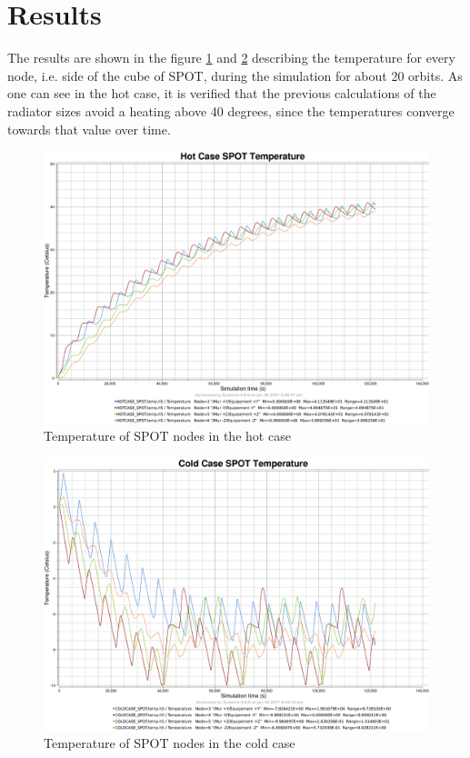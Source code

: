 \section{Results}
The results are shown in the figure \ref{fig:spothot} and \ref{fig:spotcold} describing the temperature for every node, i.e. side of the cube of SPOT, during the simulation for about 20 orbits. As one can see in the hot case, it is verified that the previous calculations of the radiator sizes avoid a heating above 40 degrees, since the temperatures converge towards that value over time. 
\begin{figure}[H]
	\centering
	\includegraphics[scale=0.15]{images/SPOT_hotcase_temperature.png}
	\caption{Temperature of SPOT nodes in the hot case}
	\label{fig:spothot}
\end{figure}

\begin{figure}[H]
	\centering
	\includegraphics[scale=0.15]{images/SPOT_coldcase_temperature.png}
	\caption{Temperature of SPOT nodes in the cold case}
	\label{fig:spotcold}
\end{figure}


